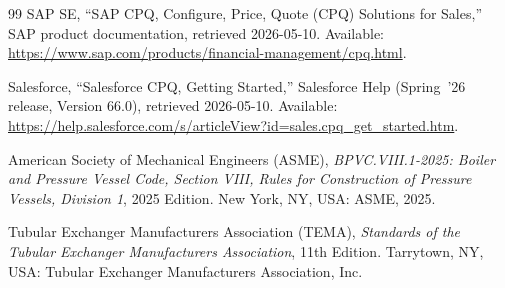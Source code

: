 \begin{thebibliography}{99}
SAP SE, ``SAP CPQ, Configure, Price, Quote (CPQ) Solutions for Sales,''
SAP product documentation, retrieved 2026-05-10. Available:
\url{https://www.sap.com/products/financial-management/cpq.html}.

Salesforce, ``Salesforce CPQ, Getting Started,'' Salesforce Help
(Spring~'26 release, Version 66.0), retrieved 2026-05-10. Available:
\url{https://help.salesforce.com/s/articleView?id=sales.cpq_get_started.htm}.


American Society of Mechanical Engineers (ASME), \emph{BPVC.VIII.1-2025: Boiler
and Pressure Vessel Code, Section VIII, Rules for Construction of Pressure
Vessels, Division 1}, 2025 Edition. New York, NY, USA: ASME, 2025.

Tubular Exchanger Manufacturers Association (TEMA), \emph{Standards of the
Tubular Exchanger Manufacturers Association}, 11th Edition. Tarrytown, NY, USA:
Tubular Exchanger Manufacturers Association, Inc.

\end{thebibliography}
